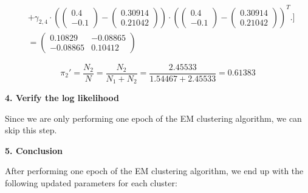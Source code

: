 \documentclass[12pt]{article}
\begin{document}
\begin{enumerate}[leftmargin=\labelsep]
\begin{align*}
                        & + \gamma_{2,4} \cdot \left(\begin{pmatrix} 0.4 \\ -0.1 \end{pmatrix} - \begin{pmatrix} 0.30914 \\ 0.21042 \end{pmatrix}\right) \cdot \left(\begin{pmatrix} 0.4 \\ -0.1 \end{pmatrix} - \begin{pmatrix} 0.30914 \\ 0.21042 \end{pmatrix}\right)^T
                        \Bigg. \Bigg] \\
                        & = \begin{pmatrix} 0.10829 & -0.08865 \\ -0.08865 & 0.10412 \end{pmatrix}
          \end{align*}
          \endgroup

          \begin{equation*}
              \pi_2' = \frac{N_2}{N} = \frac{N_2}{N_1 + N_2} = \frac{2.45533}{1.54467 + 2.45533} = 0.61383
          \end{equation*}

          \vskip 0.2cm
          {
          \color{stepscolor}
          \begin{large}\textbf{4. Verify the log likelihood}\end{large}
          \vskip 0.1cm
          }

          Since we are only performing one epoch of the EM clustering algorithm, we can skip this step.

          \vskip 0.2cm
          {
          \color{stepscolor}
          \begin{large}\textbf{5. Conclusion}\end{large}
          \vskip 0.1cm
          }

          After performing one epoch of the EM clustering algorithm, we end up with the following updated parameters for each cluster:


\end{enumerate}
\end{document}
